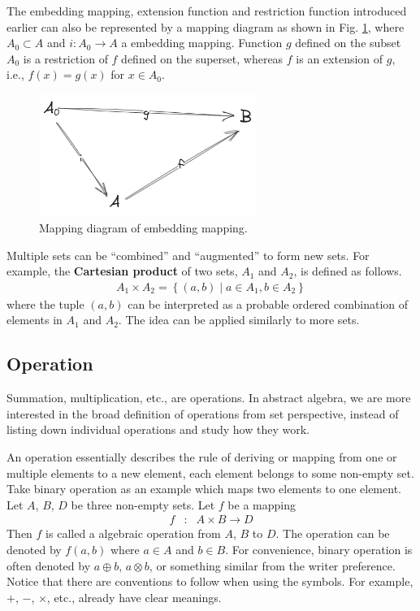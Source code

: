 The embedding mapping, extension function and restriction function introduced earlier can also be represented by a mapping diagram as shown in Fig. \ref{fig:embedding_mapping_plot}, where $A_0 \subset A$ and $i:A_0\rightarrow A$ a embedding mapping. Function $g$ defined on the subset $A_0$ is a restriction of $f$ defined on the superset, whereas $f$ is an extension of $g$, i.e., $f(x) = g(x)$ for $x\in A_0$.
\begin{figure}[htbp]
	\centering
	\includegraphics[width=200pt]{chapters/abstract-algebra-basics/figures/embedding_mapping_plot.png}
	\caption{Mapping diagram of embedding mapping.} \label{fig:embedding_mapping_plot}
\end{figure}

Multiple sets can be ``combined'' and ``augmented'' to form new sets. For example, the \textbf{Cartesian product} of two sets, $A_1$ and $A_2$, is defined as follows.
\begin{eqnarray}
	A_1 \times A_2 = \left\{(a,b) \middle| a \in A_1, b\in A_2\right\} \nonumber
\end{eqnarray}
where the tuple $(a,b)$ can be interpreted as a probable ordered combination of elements in $A_1$ and $A_2$. The idea can be applied similarly to more sets.

\subsection{Operation}

Summation, multiplication, etc., are operations. In abstract algebra, we are more interested in the broad definition of operations from set perspective, instead of listing down individual operations and study how they work.

An operation essentially describes the rule of deriving or mapping from one or multiple elements to a new element, each element belongs to some non-empty set. Take binary operation as an example which maps two elements to one element. Let $A$, $B$, $D$ be three non-empty sets. Let $f$ be a mapping
\begin{eqnarray}
	f &:& A \times B \rightarrow D \label{eq:operation_general_def}
\end{eqnarray}
Then $f$ is called a algebraic operation from $A$, $B$ to $D$. The operation can be denoted by $f(a,b)$ where $a\in A$ and $b\in B$. For convenience, binary operation is often denoted by $a\oplus b$, $a\otimes b$, or something similar from the writer preference. Notice that there are conventions to follow when using the symbols. For example, $+$, $-$, $\times$, etc., already have clear meanings.

